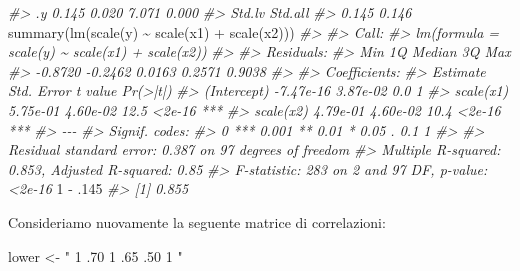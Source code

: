 \documentclass[
  11pt,
]{krantz}
\makeatletter
\newenvironment{Shaded}{\begin{snugshade}}{\end{snugshade}}
\newcommand{\CommentTok}[1]{\textcolor[rgb]{0.37,0.37,0.37}{\textit{#1}}}
\newcommand{\DecValTok}[1]{\textcolor[rgb]{0.06,0.06,0.06}{#1}}
\newcommand{\FunctionTok}[1]{\textcolor[rgb]{0,0,0}{#1}}
\newcommand{\NormalTok}[1]{#1}
\newcommand{\OtherTok}[1]{\textcolor[rgb]{0.37,0.37,0.37}{#1}}
\newcommand{\SpecialCharTok}[1]{\textcolor[rgb]{0,0,0}{#1}}
\newcommand{\StringTok}[1]{\textcolor[rgb]{0.5,0.5,0.5}{#1}}
\newenvironment{kframe}{%
\medskip{}
\setlength{\fboxsep}{.8em}
 \def\at@end@of@kframe{}%
 \ifinner\ifhmode%
  \def\at@end@of@kframe{\end{minipage}}%
  \begin{minipage}{\columnwidth}%
 \fi\fi%
 \def\FrameCommand##1{\hskip\@totalleftmargin \hskip-\fboxsep
 \colorbox{shadecolor}{##1}\hskip-\fboxsep
     \hskip-\linewidth \hskip-\@totalleftmargin \hskip\columnwidth}%
 \MakeFramed {\advance\hsize-\width
   \@totalleftmargin\z@ \linewidth\hsize
   \@setminipage}}%
 {\par\unskip\endMakeFramed%
 \at@end@of@kframe}
\renewenvironment{Shaded}{\begin{kframe}}{\end{kframe}}
\theoremstyle{definition}
\theoremstyle{definition}
\theoremstyle{definition}
\theoremstyle{definition}
\theoremstyle{remark}
\makeatother
\begin{document}
\begin{Shaded}
\begin{Highlighting}[]
\CommentTok{\#\textgreater{}    .y                 0.145    0.020    7.071    0.000}
\CommentTok{\#\textgreater{}    Std.lv  Std.all}
\CommentTok{\#\textgreater{}     0.145    0.146}
\FunctionTok{summary}\NormalTok{(}\FunctionTok{lm}\NormalTok{(}\FunctionTok{scale}\NormalTok{(y) }\SpecialCharTok{\textasciitilde{}} \FunctionTok{scale}\NormalTok{(x1) }\SpecialCharTok{+} \FunctionTok{scale}\NormalTok{(x2)))}
\CommentTok{\#\textgreater{} }
\CommentTok{\#\textgreater{} Call:}
\CommentTok{\#\textgreater{} lm(formula = scale(y) \textasciitilde{} scale(x1) + scale(x2))}
\CommentTok{\#\textgreater{} }
\CommentTok{\#\textgreater{} Residuals:}
\CommentTok{\#\textgreater{}     Min      1Q  Median      3Q     Max }
\CommentTok{\#\textgreater{} {-}0.8720 {-}0.2462  0.0163  0.2571  0.9038 }
\CommentTok{\#\textgreater{} }
\CommentTok{\#\textgreater{} Coefficients:}
\CommentTok{\#\textgreater{}              Estimate Std. Error t value Pr(\textgreater{}|t|)    }
\CommentTok{\#\textgreater{} (Intercept) {-}7.47e{-}16   3.87e{-}02     0.0        1    }
\CommentTok{\#\textgreater{} scale(x1)    5.75e{-}01   4.60e{-}02    12.5   \textless{}2e{-}16 ***}
\CommentTok{\#\textgreater{} scale(x2)    4.79e{-}01   4.60e{-}02    10.4   \textless{}2e{-}16 ***}
\CommentTok{\#\textgreater{} {-}{-}{-}}
\CommentTok{\#\textgreater{} Signif. codes:  }
\CommentTok{\#\textgreater{} 0 \textquotesingle{}***\textquotesingle{} 0.001 \textquotesingle{}**\textquotesingle{} 0.01 \textquotesingle{}*\textquotesingle{} 0.05 \textquotesingle{}.\textquotesingle{} 0.1 \textquotesingle{} \textquotesingle{} 1}
\CommentTok{\#\textgreater{} }
\CommentTok{\#\textgreater{} Residual standard error: 0.387 on 97 degrees of freedom}
\CommentTok{\#\textgreater{} Multiple R{-}squared:  0.853,  Adjusted R{-}squared:  0.85 }
\CommentTok{\#\textgreater{} F{-}statistic:  283 on 2 and 97 DF,  p{-}value: \textless{}2e{-}16}
\DecValTok{1} \SpecialCharTok{{-}}\NormalTok{ .}\DecValTok{145}
\CommentTok{\#\textgreater{} [1] 0.855}
\end{Highlighting}
\end{Shaded}

Consideriamo nuovamente la seguente matrice di correlazioni:

\begin{Shaded}
\begin{Highlighting}[]
\NormalTok{lower }\OtherTok{\textless{}{-}} \StringTok{"}
\StringTok{  1}
\StringTok{  .70 1}
\StringTok{  .65 .50 1}
\StringTok{"}
\end{Highlighting}
\end{Shaded}
\end{document}
